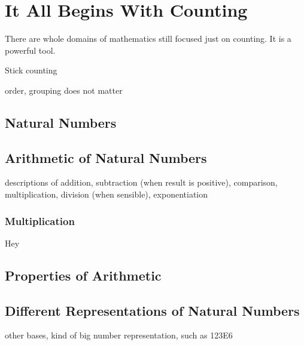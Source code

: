 \chapter{It All Begins With Counting}

 There are whole domains of mathematics still focused just on counting. It is a powerful tool. 

Stick counting

order, grouping does not matter

\section{Natural Numbers}

\section{Arithmetic of Natural Numbers}

descriptions of addition, subtraction (when result is positive), comparison, multiplication, division (when sensible), exponentiation

\subsection{Multiplication}

Hey 

\section{Properties of Arithmetic}

\section{Different Representations of Natural Numbers}

other bases, kind of big number representation, such as 123E6